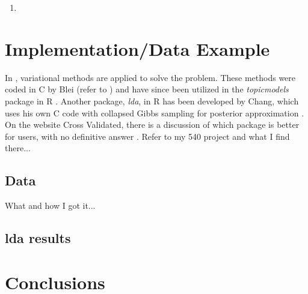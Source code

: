 \documentclass[3p,times]{elsarticle}
\begin{document}
\begin{enumerate}
	\item 
\end{enumerate}

\section{Implementation/Data Example}
\noindent In \cite{lda}, variational methods are applied to solve the problem. These methods were coded in C by Blei (refer to \cite{Ccode}) and have since been utilized in the \textit{topicmodels} package in R \cite{topicsR}. Another package, \textit{lda}, in R has been developed by Chang, which uses his own C code with collapsed Gibbs sampling for posterior approximation \cite{ldaR}. On the website Cross Validated, there is a discussion of which package is better for users, with no definitive answer \cite{STACK}. Refer to my 540 project and what I find there...

\subsection{Data}
What and how I got it...
\subsection{lda results}

\section{Conclusions}



\end{document}
